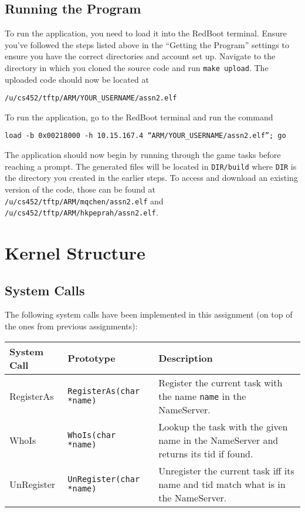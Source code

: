 \documentclass[12pt]{article}
\begin{document}
\subsection{Running the Program}
To run the application, you need to load it into the RedBoot terminal.  Ensure you've followed the steps listed above in the ``Getting the Program'' settings to ensure you have the correct directories and account set up.  Navigate to the directory in which you cloned the source code and run \texttt{make upload}.  The uploaded code should now be located at
\begin{center}
  \texttt{/u/cs452/tftp/ARM/YOUR\_USERNAME/assn2.elf}
\end{center}
To run the application, go to the RedBoot terminal and run the command
\begin{center}
  \texttt{load -b 0x00218000 -h 10.15.167.4 ``ARM/YOUR\_USERNAME/assn2.elf''; go}
\end{center}
The application should now begin by running through the game tasks before reaching a prompt.  The generated files will be located in \texttt{DIR/build} where \texttt{DIR} is the directory you created in the earlier steps.  To access and download an existing version of the code, those can be found at \texttt{/u/cs452/tftp/ARM/mqchen/assn2.elf} and \texttt{/u/cs452/tftp/ARM/hkpeprah/assn2.elf}.
\\[2\baselineskip]

\section{Kernel Structure}
\subsection{System Calls}
The following system calls have been implemented in this assignment (on top of the ones from previous assignments):
\begin{center}
  \begin{tabular}{|l|l|p{8cm}|}
    \hline
    {\bf System Call} & {\bf Prototype} & {\bf Description} \\\hline
    RegisterAs & \texttt{RegisterAs(char *name)} & Register the current task with the name \texttt{name} in the NameServer. \\\hline
    WhoIs & \texttt{WhoIs(char *name)} & Lookup the task with the given name in the NameServer and returns its tid if found. \\\hline
    UnRegister & \texttt{UnRegister(char *name)} & Unregister the current task iff its name and tid match what is in the NameServer. \\\hline
  \end{tabular}
\end{center}
\end{document}

